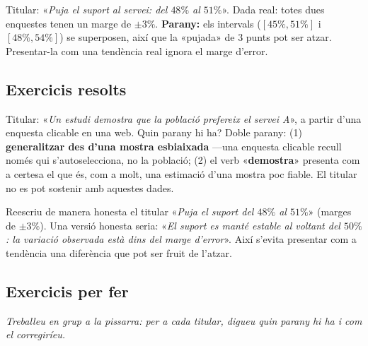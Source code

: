 \begin{exemple}
Titular: «\emph{Puja el suport al servei: del $48\%$ al $51\%$}». Dada real: totes dues
enquestes tenen un marge de $\pm 3\%$. \textbf{Parany:} els intervals ($[45\%,51\%]$ i
$[48\%,54\%]$) se superposen, així que la «pujada» de $3$ punts pot ser atzar. Presentar-la
com una tendència real ignora el marge d'error.
\end{exemple}

\subsection{Exercicis resolts}

\begin{exresolt}
Titular: «\emph{Un estudi demostra que la població prefereix el servei A}», a partir d'una
enquesta clicable en una web. Quin parany hi ha?
\solucio
Doble parany: (1) \textbf{generalitzar des d'una mostra esbiaixada} —una enquesta clicable
recull només qui s'autoselecciona, no la població; (2) el verb «\textbf{demostra}» presenta
com a certesa el que és, com a molt, una estimació d'una mostra poc fiable. El titular no es
pot sostenir amb aquestes dades.
\end{exresolt}

\begin{exresolt}
Reescriu de manera honesta el titular «\emph{Puja el suport del $48\%$ al $51\%$}» (marges
de $\pm 3\%$).
\solucio
Una versió honesta seria: «\emph{El suport es manté estable al voltant del $50\%$: la
variació observada està dins del marge d'error}». Així s'evita presentar com a tendència una
diferència que pot ser fruit de l'atzar.
\end{exresolt}

\subsection{Exercicis per fer}

\noindent\textit{Treballeu en grup a la pissarra: per a cada titular, digueu quin parany hi
ha i com el corregiríeu.}

